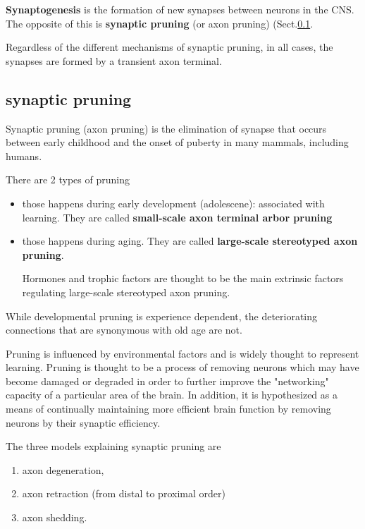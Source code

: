 {\bf Synaptogenesis} is the formation of new synapses between neurons in the
CNS. The opposite of this is {\bf synaptic pruning} (or axon pruning)
(Sect.\ref{sec:synaptic-pruning}.

Regardless of the different mechanisms of synaptic pruning, in all cases, the
synapses are formed by a transient axon terminal.


\subsection{synaptic pruning}
\label{sec:synaptic-pruning}
\label{sec:axon-pruning}

Synaptic pruning (axon pruning) is the elimination of synapse that occurs
between early childhood and the onset of puberty in many mammals, including
humans.


There are 2 types of pruning
\begin{itemize}
  \item those happens during early development (adolescene): associated with
  learning. They are called {\bf small-scale axon terminal arbor pruning}
  
  \item those happens during aging. They are called {\bf  large-scale
  stereotyped axon pruning}.
  
Hormones and trophic factors are thought to be the main extrinsic factors
regulating  large-scale stereotyped axon pruning.
  
\end{itemize}
While developmental pruning is experience dependent, the deteriorating
connections that are synonymous with old age are not. 

Pruning is influenced by environmental factors and is widely thought to
represent learning. Pruning is thought to be a process of removing neurons which
may have become damaged or degraded in order to further improve the "networking"
capacity of a particular area of the brain. In addition, it is hypothesized as a
means of continually maintaining more efficient brain function by removing
neurons by their synaptic efficiency.

The three models explaining synaptic pruning are 
\begin{enumerate}
  \item axon degeneration, 
  
  \item axon retraction (from distal to proximal order)
  
  \item axon shedding.
\end{enumerate}

